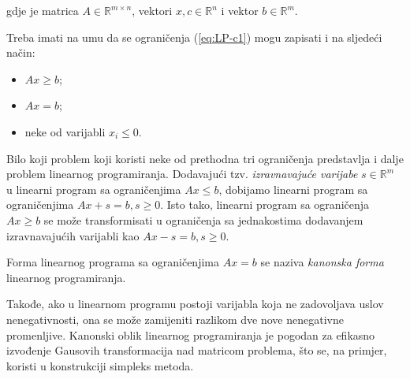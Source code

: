 \documentclass[a4paper, utf8, 11pt, colorlinks]{book}
\theoremstyle{definition}
\begin{document}
gdje je matrica $A \in \mathbb{R}^{m \times n}$, vektori  $x,c \in \mathbb{R}^n$ i vektor $b \in \mathbb{R}^{m}$.

Treba imati na umu da se ograničenja (\ref{eq:LP-c1}) mogu zapisati i na sljedeći način:
\begin{itemize}
    \item $Ax \geq b$;
    \item $Ax = b$;
    \item neke od varijabli $x_i\leqslant 0$.
\end{itemize}
Bilo koji problem koji koristi neke od prethodna tri ograničenja predstavlja i dalje problem linearnog programiranja. Dodavajući tzv. \emph{izravnavajuće varijabe} $s \in \mathbb{R}^m$ u linearni program sa ograničenjima $Ax \leq b$, dobijamo linearni program sa ograničenjima $Ax + s = b, s \geq 0$. Isto tako, linearni program sa ograničenja $Ax \geq b$ se može transformisati u ograničenja sa jednakostima dodavanjem izravnavajućih varijabli kao $Ax - s = b, s\geq 0$.

 Forma linearnog programa sa ograničenjima $Ax = b$ se naziva \emph{kanonska forma} linearnog programiranja. 
 
 Takođe, ako u linearnom
programu postoji varijabla koja ne zadovoljava uslov nenegativnosti, ona se može zamijeniti razlikom dve nove nenegativne promenljive. Kanonski oblik linearnog programiranja je pogodan za efikasno izvođenje Gausovih transformacija  nad matricom problema, što se, na primjer, koristi u konstrukciji simpleks metoda.   %
\end{document}
